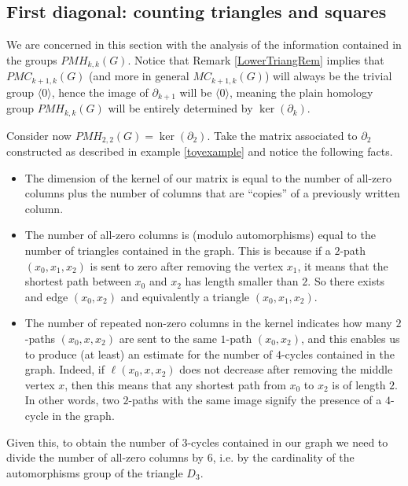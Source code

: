 \documentclass[runningheads]{llncs}
\begin{document}

\subsection{First diagonal: counting triangles and squares}
\label{FirstDiagonal}
We are concerned in this section with the analysis of the information contained in the groups $PMH_{k,k}(G)$.
Notice that Remark \ref{LowerTriangRem} implies that $PMC_{k+1,k}(G)$ (and more in general $MC_{k+1,k}(G)$) will always be the trivial group $\langle 0 \rangle$, hence the image of $\partial_{k+1}$ will be $\langle 0 \rangle$, meaning the plain homology group $PMH_{k,k}(G)$ will be entirely determined by $\ker(\partial_k)$.


Consider now $PMH_{2,2}(G)=\ker(\partial_2)$.
Take the matrix associated to $\partial_2$ constructed as described in example \ref{toyexample} and notice the following facts.

\begin{itemize}
    \item The dimension of the kernel of our matrix is equal to the number of all-zero columns plus the number of columns that are ``copies'' of a previously written column.
    \item The number of all-zero columns is (modulo automorphisms) equal to the number of triangles contained in the graph. 
    This is because if a $2$-path $(x_0,x_1,x_2)$ is sent to zero after removing the vertex $x_1$, it means that the shortest path between $x_0$ and $x_2$ has length smaller than $2$. 
    So there exists and edge $(x_0,x_2)$ and equivalently a triangle $(x_0,x_1,x_2)$.
    \item The number of repeated non-zero columns in the kernel indicates how many $2$-paths $(x_0,x,x_2)$ are sent to the same $1$-path $(x_0,x_2)$, and this enables us to produce (at least) an estimate for the number of $4$-cycles contained in the graph.
    Indeed, if $\ell(x_0,x,x_2)$ does not decrease after removing the middle vertex $x$, then this means that any shortest path from $x_0$ to $x_2$ is of length $2$. In other words, two $2$-paths with the same image signify the presence of a $4$-cycle in the graph.
\end{itemize}

Given this, to obtain the number of $3$-cycles contained in our graph we need to divide the number of all-zero columns by $6$, i.e. by the cardinality of the automorphisms group of the triangle $D_3$.
\end{document}
